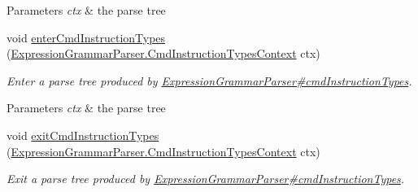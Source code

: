 \begin{DoxyCompactItemize}
\begin{DoxyCompactList}
\begin{DoxyParams}{Parameters}
{\em ctx} & the parse tree\\
\hline
\end{DoxyParams}
 \end{DoxyCompactList}\item 
void \hyperlink{classgov_1_1nasa_1_1jpf_1_1inspector_1_1server_1_1expression_1_1parser_1_1_expression_grammar_base_listener_a2c2771bcac8c80eb11edc8b1ee836d23}{enter\+Cmd\+Instruction\+Types} (\hyperlink{classgov_1_1nasa_1_1jpf_1_1inspector_1_1server_1_1expression_1_1parser_1_1_expression_grammar_pab3186941420d0c466c6d856eeff6b665}{Expression\+Grammar\+Parser.\+Cmd\+Instruction\+Types\+Context} ctx)
\begin{DoxyCompactList}\small\item\em Enter a parse tree produced by \hyperlink{classgov_1_1nasa_1_1jpf_1_1inspector_1_1server_1_1expression_1_1parser_1_1_expression_grammar_parser_a12e3659aace4eacebed317642d151170}{Expression\+Grammar\+Parser\#cmd\+Instruction\+Types}.


\begin{DoxyParams}{Parameters}
{\em ctx} & the parse tree\\
\hline
\end{DoxyParams}
 \end{DoxyCompactList}\item 
void \hyperlink{classgov_1_1nasa_1_1jpf_1_1inspector_1_1server_1_1expression_1_1parser_1_1_expression_grammar_base_listener_a0d0ec02c07e661bdf1031b1f8f45c2a7}{exit\+Cmd\+Instruction\+Types} (\hyperlink{classgov_1_1nasa_1_1jpf_1_1inspector_1_1server_1_1expression_1_1parser_1_1_expression_grammar_pab3186941420d0c466c6d856eeff6b665}{Expression\+Grammar\+Parser.\+Cmd\+Instruction\+Types\+Context} ctx)
\begin{DoxyCompactList}\small\item\em Exit a parse tree produced by \hyperlink{classgov_1_1nasa_1_1jpf_1_1inspector_1_1server_1_1expression_1_1parser_1_1_expression_grammar_parser_a12e3659aace4eacebed317642d151170}{Expression\+Grammar\+Parser\#cmd\+Instruction\+Types}.



\end{DoxyCompactList}
\end{DoxyCompactItemize}
